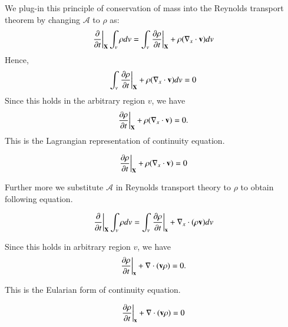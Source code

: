 We plug-in this principle of conservation of mass into the Reynolds transport theorem by changing $\mathcal{A}$ to $\rho$ as:
\begin{equation}
\left.\frac{\partial}{\partial{t}}\right|_{\mathbf{X}}\int_v{\rho}dv			
=\int_v \left.\frac{\partial\rho}{\partial{t}}\right|_{\mathbf{X}} + \rho(\nabla_x \cdot {\mathbf{v}})dv
\end{equation}
Hence,
\begin{equation}
 \int_v \left.\frac{\partial\rho}{\partial{t}}\right|_{\mathbf{X}} + \rho(\nabla_x \cdot {\mathbf{v}})dv = 0 
\end{equation}
%
Since this holds in the arbitrary region $v$, we have
%
\begin{equation}
\left.\frac{\partial\rho}{\partial{t}}\right|_{\mathbf{X}} + \rho(\nabla_x \cdot {\mathbf{v}}) = 0.
\end{equation}
%
This is the Lagrangian representation of continuity equation.




\begin{tcolorbox}[title=continuity equation (Lagrangian form)]
\begin{equation}
\left.\frac{\partial\rho}{\partial{t}}\right|_{\mathbf{X}} + \rho(\nabla_x \cdot {\mathbf{v}}) = 0 
\end{equation}
\end{tcolorbox}


Further more we substitute $\mathcal{A}$ in Reynolds transport theory to $\rho$ to obtain following equation.

\begin{equation}
\left.\frac{\partial}{\partial{t}}\right|_{\mathbf{X}}\int_v{\rho}dv			
=\int_v \left.\frac{\partial\rho}{\partial{t}}\right|_{\mathbf{x}} + \nabla_x \cdot ( \rho{\mathbf{v}} ) dv
\end{equation}

Since this holds in arbitrary region $v$, we have
%
\begin{equation}
\left.\frac{\partial\rho}{\partial{t}}\right|_{\mathbf{x}} + \nabla \cdot ({\mathbf{v}} \rho) = 0.
\end{equation}

This is the Eularian form of continuity equation.

\begin{tcolorbox}[title=continuity equation (Eularian form)]
\begin{equation}
\left.\frac{\partial\rho}{\partial{t}}\right|_{\mathbf{x}} + \nabla \cdot ({\mathbf{v}} \rho) = 0
\end{equation}
\end{tcolorbox}


